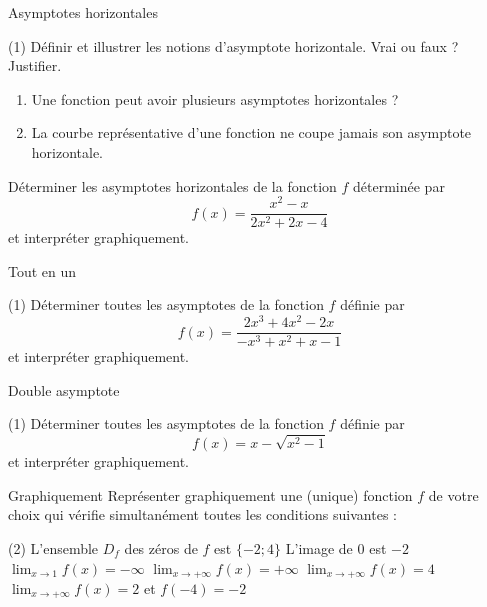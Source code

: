 \documentclass[a4paper,12pt]{article}
\begin{document}
\begin{activite}[label=acti:asyhor]{Asymptotes horizontales}
\tcblower
\begin{tasks}(1)
  \task Définir et illustrer les notions d’asymptote horizontale.
  \task Vrai ou faux ? Justifier.
    \begin{enumerate}
      \item Une fonction peut avoir plusieurs asymptotes horizontales ?
      \item La courbe représentative d’une fonction ne coupe jamais son asymptote horizontale.
    \end{enumerate}
  \task Déterminer les asymptotes horizontales de la fonction \(f\) déterminée par
  \[
    f(x)=\dfrac{x^2 - x}{2x^2 + 2x - 4}
  \]
  et interpréter graphiquement.
\end{tasks}
\end{activite}



\begin{activite}[label=acti:asyconcl]{Tout en un}
\tcblower
\begin{tasks}(1)
  \task Déterminer toutes les asymptotes de la fonction \(f\) définie par
  \[
    f(x)=\dfrac{2x^3+4x^2-2x}{-x^3+x^2+x-1}
  \]
  et interpréter graphiquement.
\end{tasks}
\end{activite}

\begin{activite}[label=acti:asydouble]{Double asymptote}
\tcblower
\begin{tasks}(1)
  \task Déterminer toutes les asymptotes de la fonction \(f\) définie par
  \[
    f(x)=x-\sqrt{x^2-1}
  \]
  et interpréter graphiquement.
\end{tasks}
\end{activite}

\begin{activite}[label=acti:constrgraph]
Graphiquement
\tcblower
Représenter graphiquement une (unique) fonction $f$ de votre choix qui vérifie simultanément toutes les conditions suivantes :

\begin{tasks}(2)
\task L'ensemble $D_f$ des zéros de $f$ est $\{-2;4\}$
\task L'image de $0$ est $-2$
\task $\displaystyle\lim_{x \to 1} f(x) = -\infty$
\task $\displaystyle\lim_{x \to +\infty} f(x) = +\infty$
\task $\displaystyle\lim_{x \to +\infty} f(x) = 4$
\task $\displaystyle\lim_{x \to +\infty} f(x) = 2$ et $f(-4) = -2$
\end{tasks}
\end{activite}
\end{document}
